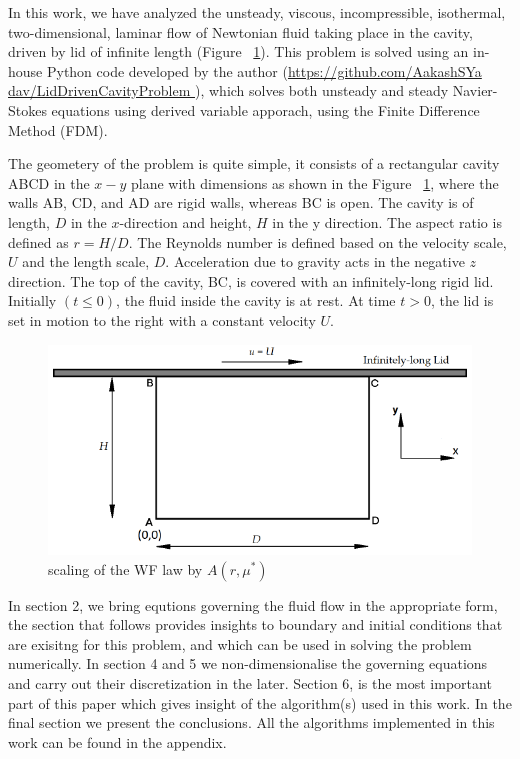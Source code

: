 \documentclass{article}
\begin{document}
In this work, we have analyzed the unsteady, viscous, incompressible, isothermal, two-dimensional, laminar flow of Newtonian fluid taking place in the cavity, driven by lid of infinite length (Figure ~\ref{fig:cavityFig}). 
This problem is solved using an in-house Python code developed by the author (\href{https://github.com/AakashSYadav/LidDrivenCavityProblem}{https://github.com/AakashSYa dav/LidDrivenCavityProblem }), which solves both unsteady and steady  Navier-Stokes equations using derived variable apporach, using the Finite Difference Method (FDM).

The geometery of the problem is quite simple, it consists of a rectangular cavity ABCD in the $x-y$ plane with dimensions as shown in the Figure ~\ref{fig:cavityFig}, where the walls AB, CD, and AD are rigid walls, whereas BC is open. The cavity is of length, $D$ in the $x$-direction and height, $H$ in the y direction. The aspect ratio is defined as $r=H/D$. The Reynolds number is defined based on the velocity scale, $U$ and the length scale, $D$. Acceleration due to gravity acts in the negative $z$ direction. The top of the cavity, BC, is covered with an infinitely-long rigid lid. Initially $(t \leq 0)$, the fluid inside the cavity is at rest. At time $t > 0$, the lid is set in motion to the right with a constant velocity $U $. 

\begin{figure}[h!]
\centering
\includegraphics[scale=.5]{cavityFig.png}
\caption{scaling of the WF law by $A\left(r,\mu^*\right)$}
\label{fig:cavityFig}
\end{figure}

In section 2, we bring equtions governing the fluid flow in the appropriate form, the section that follows provides insights to boundary and initial conditions that are exisitng for this problem, and which can be used in solving the problem numerically. In section 4 and 5 we non-dimensionalise the governing equations and carry out their discretization in the later. Section 6, is the most important part of this paper which gives insight of the algorithm(s) used in this work. In the final section we present the conclusions. All the algorithms implemented in this work can be found in the appendix.
\end{document}
